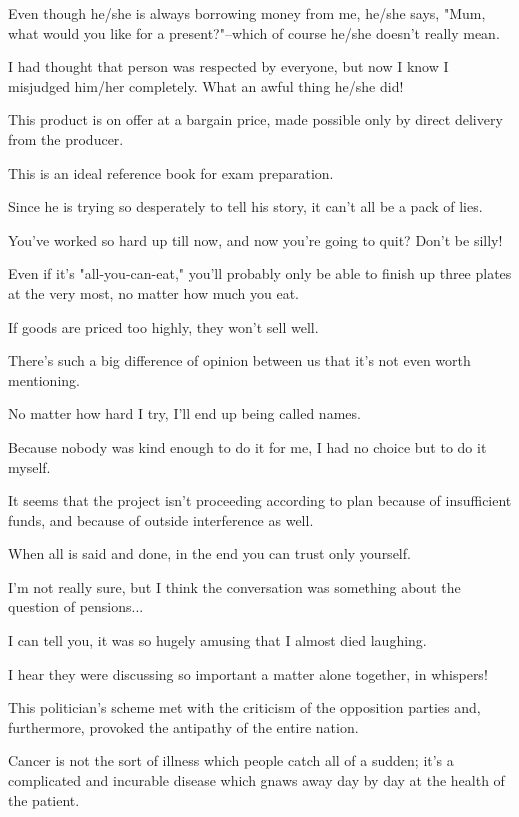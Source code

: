 \item[159.] Even though he/she is always borrowing money from me, he/she says, "Mum, what would you like for a present?"--which of course he/she doesn't really mean. 
\item[160.] I had thought that person was respected by everyone, but now I know I misjudged him/her completely.  What an awful thing he/she did!
\item[161.] This product is on offer at a bargain price, made possible only by direct delivery from the producer.
\item[162.] This is an ideal reference book for exam preparation.
\item[163.] Since he is trying so desperately to tell his story, it can't all be a pack of lies.
\item[164.] You've worked so hard up till now, and now you're going to quit?  Don't be silly!
\item[165.] Even if it's "all-you-can-eat," you'll probably only be able to finish up three plates at the very most, no matter how much you eat.
\item[166.] If goods are priced too highly, they won't sell well.
\item[167.] There's such a big difference of opinion between us that it's not even worth mentioning.
\item[168.] No matter how hard I try, I'll end up being called names.
\item[169.] Because nobody was kind enough to do it for me, I had no choice but to do it myself.
\item[170.] It seems that the project isn't proceeding according to plan because of insufficient funds, and because of outside interference as well.
\item[171.] When all is said and done, in the end you can trust only yourself.
\item[172.] I'm not really sure, but I think the conversation was something about the question of pensions...
\item[173.] I can tell you, it was so hugely amusing that I almost died laughing.
\item[174.] I hear they were discussing so important a matter alone together, in whispers!
\item[175.] This politician's scheme met with the criticism of the opposition parties and, furthermore, provoked the antipathy of the entire nation.
\item[176.] Cancer is not the sort of illness which people catch all of a sudden; it's a complicated and incurable disease which gnaws away day by day at the health of the patient.
